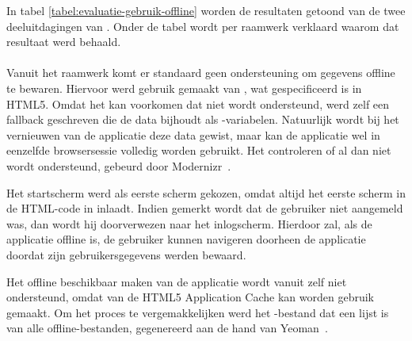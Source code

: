 In tabel \ref{tabel:evaluatie-gebruik-offline} worden de resultaten getoond van de twee deeluitdagingen van .
Onder de tabel wordt per raamwerk verklaard waarom dat resultaat werd behaald.

\begin{table}[H]
\centering
{}
\caption{Gebruik voor }
\label{tabel:evaluatie-gebruik-offline}
\end{table}

\paragraph{\jqm}
Vanuit het raamwerk komt er standaard geen ondersteuning om gegevens offline te bewaren.
Hiervoor werd gebruik gemaakt van , wat gespecificeerd is in HTML5.
Omdat het kan voorkomen dat  niet wordt ondersteund, werd zelf een fallback geschreven die de data bijhoudt als \js{}-variabelen.
Natuurlijk wordt bij het vernieuwen van de applicatie deze data gewist, maar kan de applicatie wel in eenzelfde browsersessie volledig worden gebruikt.
Het controleren of  al dan niet wordt ondersteund, gebeurd door Modernizr~\cite{Modernizr2012}.


Het startscherm werd als eerste scherm gekozen, omdat \jqm{} altijd het eerste scherm in de HTML-code in inlaadt.
Indien gemerkt wordt dat de gebruiker niet aangemeld was, dan wordt hij doorverwezen naar het inlogscherm.
Hierdoor zal, als de applicatie offline is, de gebruiker kunnen navigeren doorheen de applicatie doordat zijn gebruikersgegevens werden bewaard.

Het offline beschikbaar maken van de applicatie wordt vanuit \jqm{} zelf niet ondersteund, omdat van de HTML5 Application Cache kan worden gebruik gemaakt.
Om het proces te vergemakkelijken werd het -bestand dat een lijst is van alle offline-bestanden, gegenereerd aan de hand van Yeoman~\cite{Yeoman2013}.

